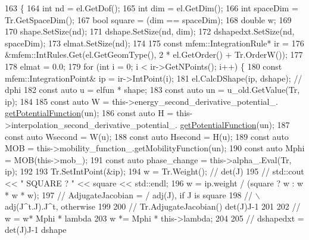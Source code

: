 \begin{DoxyCode}
163                             \{
164   \textcolor{keywordtype}{int} nd = el.GetDof();
165   \textcolor{keywordtype}{int} dim = el.GetDim();
166   \textcolor{keywordtype}{int} spaceDim = Tr.GetSpaceDim();
167   \textcolor{keywordtype}{bool} square = (dim == spaceDim);
168   \textcolor{keywordtype}{double} w;
169 
170   shape.SetSize(nd);
171   dshape.SetSize(nd, dim);
172   dshapedxt.SetSize(nd, spaceDim);
173   elmat.SetSize(nd);
174 
175   \textcolor{keyword}{const} mfem::IntegrationRule* ir =
176       &mfem::IntRules.Get(el.GetGeomType(), 2 * el.GetOrder() + Tr.OrderW());
177 
178   elmat = 0.0;
179   \textcolor{keywordflow}{for} (\textcolor{keywordtype}{int} i = 0; i < ir->GetNPoints(); i++) \{
180     \textcolor{keyword}{const} mfem::IntegrationPoint& ip = ir->IntPoint(i);
181     el.CalcDShape(ip, dshape);  \textcolor{comment}{// dphi}
182     \textcolor{keyword}{const} \textcolor{keyword}{auto} u = elfun * shape;
183     \textcolor{keyword}{const} \textcolor{keyword}{auto} un = u\_old.GetValue(Tr, ip);
184 
185     \textcolor{keyword}{const} \textcolor{keyword}{auto} W = this->energy\_second\_derivative\_potential\_.
      \hyperlink{classPotentialFunctions_af7b46074a256a70b110ae621d0335874}{getPotentialFunction}(un);
186     \textcolor{keyword}{const} \textcolor{keyword}{auto} H = this->interpolation\_second\_derivative\_potential\_.
      \hyperlink{classPotentialFunctions_af7b46074a256a70b110ae621d0335874}{getPotentialFunction}(un);
187     \textcolor{keyword}{const} \textcolor{keyword}{auto} Wsecond = W(u);
188     \textcolor{keyword}{const} \textcolor{keyword}{auto} Hsecond = H(u);
189     \textcolor{keyword}{const} \textcolor{keyword}{auto} MOB = this->mobility\_function\_.getMobilityFunction(un);
190     \textcolor{keyword}{const} \textcolor{keyword}{auto} Mphi = MOB(this->mob\_);
191     \textcolor{keyword}{const} \textcolor{keyword}{auto} phase\_change = this->alpha\_.Eval(Tr, ip);
192 
193     Tr.SetIntPoint(&ip);
194     w = Tr.Weight();  \textcolor{comment}{// det(J)}
195     \textcolor{comment}{// std::cout << " SQUARE  ? " << square << std::endl;}
196     w = ip.weight / (square ? w : w * w * w);
197     \textcolor{comment}{// AdjugateJacobian = / adj(J),         if J is square}
198     \textcolor{comment}{//                    \(\backslash\) adj(J^t.J).J^t, otherwise}
199 
200     \textcolor{comment}{// Tr.AdjugateJacobian() det(J)J-1}
201 
202     \textcolor{comment}{// w = w* Mphi * lambda}
203     w *= Mphi * this->lambda;
204 
205     \textcolor{comment}{// dshapedxt =  det(J)J-1 dshape}

\end{DoxyCode}
